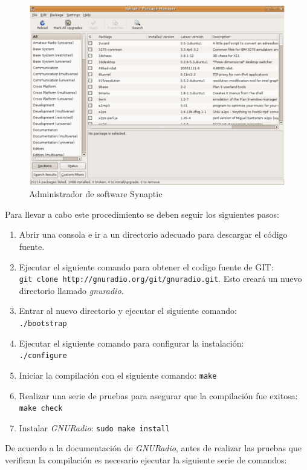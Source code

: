 \begin{figure}
\centering
	\includegraphics[scale=0.7]{figs/synaptic}
	\caption{Administrador de software Synaptic}
	\label{fig:synaptic}
\end{figure}

Para llevar a cabo este procedimiento se deben seguir los siguientes pasos:

\begin{enumerate}
  \item Abrir una consola e ir a un directorio adecuado para descargar el
  c\'odigo fuente.
  \item Ejecutar el siguiente comando para obtener el codigo fuente de GIT:\\
  \verb|git clone http://gnuradio.org/git/gnuradio.git|. Esto crear\'a un nuevo
  directorio llamado \emph{gnuradio}.
  \item Entrar al nuevo directorio y ejecutar el siguiente comando:\\
  \verb|./bootstrap|
  \item Ejecutar el siguiente comando para configurar la instalaci\'on:\\
  \verb|./configure|
  \item Iniciar la compilaci\'on con el siguiente comando: \verb|make|
  \item Realizar una serie de pruebas para asegurar que la compilaci\'on fue
  exitosa:\\
  \verb|make check|
  \item Instalar \emph{GNURadio}: \verb|sudo make install|
\end{enumerate}

De acuerdo a la documentaci\'on de \emph{GNURadio}, antes de realizar las
pruebas que verifican la compilaci\'on es necesario ejecutar la siguiente serie
de comandos:

